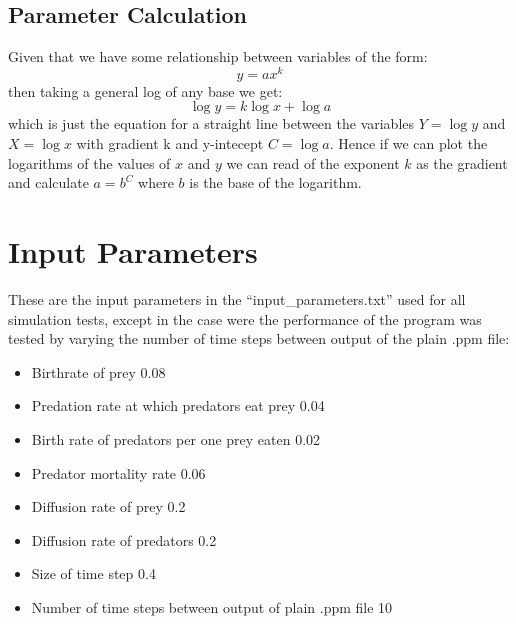 \begin{appendices}
\subsection{Parameter Calculation}
\label{ap:parametercalculation}
Given that we have some relationship between variables of the form:
\begin{equation}
y = ax^k
\end{equation}
then taking a general log of any base we get:
\begin{equation}
\log{y} = k\log{x} + \log{a}
\end{equation}
which is just the equation for a straight line between the variables $Y=\log{y}$ and $X=\log{x}$ with gradient k and y-intecept $C=\log{a}$. Hence if we can plot the logarithms of the values of $x$ and $y$ we can read of the exponent $k$ as the gradient and calculate $a = b^C$ where $b$ is the base of the logarithm.


\section{Input Parameters}
\label{ap:inputparameters}
These are the input parameters in the ``input\_parameters.txt'' used for all simulation tests, except in the case were the performance of the program was tested by varying the number of time steps between output of the plain .ppm file:
\begin{itemize}
	\item Birthrate of prey 0.08
	\item Predation rate at which predators eat prey 0.04
	\item Birth rate of predators per one prey eaten 0.02
	\item Predator mortality rate 0.06
	\item Diffusion rate of prey 0.2
	\item Diffusion rate of predators 0.2
	\item Size of time step 0.4
	\item Number of time steps between output of plain .ppm file 10
\end{itemize}

\end{appendices}
